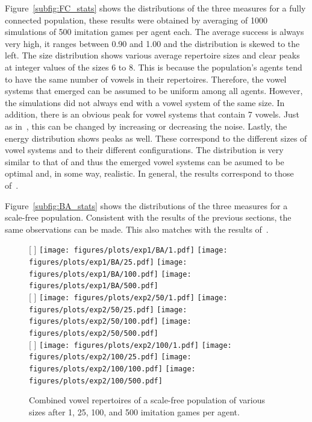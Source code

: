 \documentclass[11pt]{article}
\begin{document}
Figure~\ref{subfig:FC_stats} shows the distributions of the three measures for a fully connected population, these results were obtained by averaging of 1000 simulations of 500 imitation games per
agent each. The average success is always very high, it ranges between 0.90 and 1.00 and the distribution is skewed to the left. The size distribution shows various average repertoire sizes and clear
peaks at integer values of the sizes 6 to 8. This is because the population's agents tend to have the same number of vowels in their repertoires. Therefore, the vowel systems that emerged can be
assumed to be uniform among all agents. However, the simulations did not always end with a vowel system of the same size. In addition, there is an obvious peak for vowel systems that
contain 7 vowels. Just as in~, this can be changed by increasing or decreasing the noise.
Lastly, the energy distribution shows peaks as well. These correspond to the different sizes of vowel systems and to their different configurations. The distribution is very similar to that of
 and thus the emerged vowel systems can be asumed to be optimal and, in some way, realistic.
In general, the results correspond to those of~.

Figure~\ref{subfig:BA_stats} shows the distributions of the three measures for a scale-free population.
Consistent with the results of the previous sections, the same observations can be made. This also matches with the results
of~.

\begin{figure}[t]
    \centering
    [%
        \textwidth %
    ]%
    {%
        \texttt{[image: figures/plots/exp1/BA/1.pdf]}
        \texttt{[image: figures/plots/exp1/BA/25.pdf]}
        \texttt{[image: figures/plots/exp1/BA/100.pdf]}
        \texttt{[image: figures/plots/exp1/BA/500.pdf]}
    }%
    \\\bigskip
    [%
        \textwidth %
    ]%
    {%
        \texttt{[image: figures/plots/exp2/50/1.pdf]}
        \texttt{[image: figures/plots/exp2/50/25.pdf]}
        \texttt{[image: figures/plots/exp2/50/100.pdf]}
        \texttt{[image: figures/plots/exp2/50/500.pdf]}
    }%
    \\\bigskip
    [%
        \textwidth %
    ]%
    {%
        \texttt{[image: figures/plots/exp2/100/1.pdf]}
        \texttt{[image: figures/plots/exp2/100/25.pdf]}
        \texttt{[image: figures/plots/exp2/100/100.pdf]}
        \texttt{[image: figures/plots/exp2/100/500.pdf]}
    }%
    \caption{Combined vowel repertoires of a scale-free population of various sizes after 1, 25, 100, and 500
        imitation games per agent.}
    \label{fig:res_2}
\end{figure}
\end{document}
